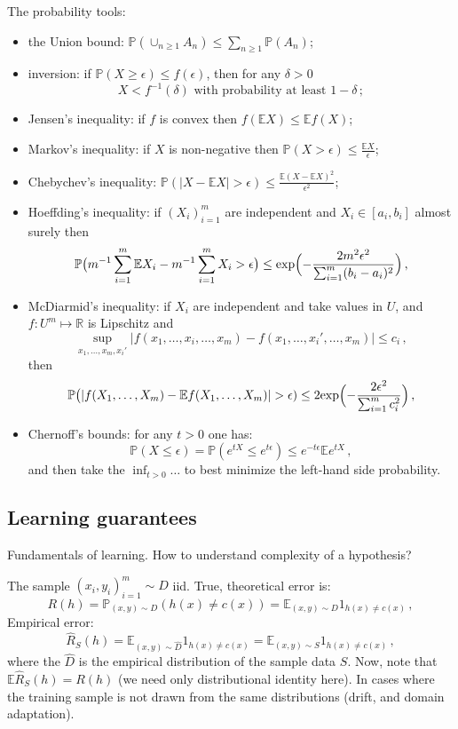 \documentclass[a4paper]{article}
\newcommand{\Real}{\mathbb{R}}
\newcommand{\ex}{\mathbb{E}}
\newcommand{\pr}{\mathbb{P}}
\begin{document}
The probability tools: \begin{itemize}
    \item the Union bound: $\pr(\cup_{n\geq1} A_n) \leq \sum_{n\geq1} \pr(A_n)$;
    \item inversion: if $\pr(X\geq \epsilon) \leq f(\epsilon)$, then for any $\delta>0$
    \[ X < f^{-1}(\delta) \text{ with probability at least } 1-\delta\,;\]
    \item Jensen's inequality: if $f$ is convex then $f(\ex X) \leq \ex f(X)$;
    \item Markov's inequality: if $X$ is non-negative then $\pr(X>\epsilon) \leq \frac{\ex X}{\epsilon}$;
    \item Chebychev's inequality: $\pr(|X - \ex X| > \epsilon) \leq \frac{\ex(X - \ex X)^2}{\epsilon^2}$;
    \item Hoeffding's inequality: if $(X_i)_{i=1}^m$ are independent and $X_i \in [a_i, b_i]$
    almost surely then 
    \[ \pr\bigl(m^{-1} \sum_{i=1}^m \ex X_i - m^{-1} \sum_{i=1}^m X_i > \epsilon \bigr)
        \leq \text{exp}\Bigl(-\frac{2 m^2\epsilon^2}{\sum_{i=1}^m(b_i-a_i)^2}\Bigr) \,, \]
    \item McDiarmid's inequality: if $X_i$ are independent and take values in $U$, and
    $f:U^m \mapsto \Real$ is Lipschitz and
    \[ \sup_{x_1, \ldots, x_m, x_i'}
        \bigl| f(x_1, \ldots, x_i, \ldots, x_m) - f(x_1, \ldots, x_i', \ldots, x_m) \bigr|
        \leq c_i\,, \]
    then
    \[ \pr\bigl( |f(X_1, \ldots, X_m) - \ex f(X_1, \ldots, X_m) | > \epsilon)
        \leq 2 \text{exp}\Bigl(-\frac{2 \epsilon^2}{\sum_{i=1}^m c_i^2}\Bigr) \,, \]
    \item Chernoff's bounds: for any $t> 0$ one has:
    \[ \pr(X\leq \epsilon) = \pr(e^{tX} \leq e^{t\epsilon}) \leq e^{-t\epsilon}\ex e^{tX} \,, \]
    and then take the $\inf_{t>0}\ldots$ to best minimize the left-hand side probability.
\end{itemize}


\subsection{Learning guarantees} %
\label{sub:learning_guarantees}
Fundamentals of learning. How to understand complexity of a hypothesis?

The sample $(x_i, y_i)_{i=1}^m \sim D$ iid. True, theoretical error is:
\[ R(h) = \pr_{(x, y)\sim D} (h(x)\neq c(x)) = \ex_{(x, y)\sim D} 1_{h(x)\neq c(x)} \,, \]
Empirical error:
\[ \hat{R}_S(h)
    = \ex_{(x, y)\sim \hat{D}} 1_{h(x)\neq c(x)}
    = \ex_{(x, y)\sim S} 1_{h(x)\neq c(x)} \,,
\]
where the $\hat{D}$ is the empirical distribution of the sample data $S$. Now, note
that $\ex \hat{R}_S(h) = R(h)$ (we need only distributional identity here). In cases
where the training sample is not drawn from the same distributions (drift, and domain
adaptation).
\end{document}
